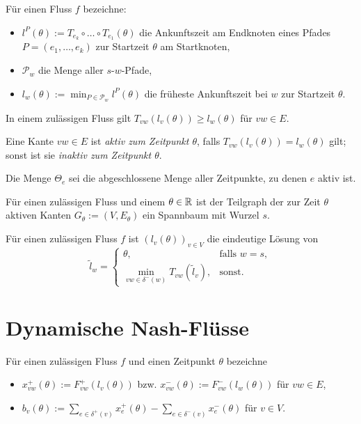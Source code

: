 	\begin{definition}
		Für einen Fluss $f$ bezeichne:
		\begin{itemize}[label=$\bullet$]
			\item $l^P(\theta) := T_{e_k}\circ\dots\circ T_{e_1}(\theta)$ die Ankunftszeit am Endknoten eines Pfades $P=(e_1,\dots,e_k)$ zur Startzeit $\theta$ am Startknoten,
			\item $\mathcal{P}_w$ die Menge aller $s$-$w$-Pfade,
			\item $l_w(\theta) := \min_{P\in\mathcal{P}_w} l^P(\theta)$ die früheste Ankunftszeit bei $w$ zur Startzeit $\theta$.
		\end{itemize}
	\end{definition}
	\begin{lemma}[Dreiecksungl.]
		In einem zulässigen Fluss gilt $T_{vw}(l_v(\theta))\geq l_w(\theta)$ für $vw\in E$.
	\end{lemma}

	\begin{definition}
		Eine Kante $vw\in E$ ist \emph{aktiv zum Zeitpunkt $\theta$}, falls $T_{vw}(l_v(\theta)) = l_w(\theta)$ gilt; sonst ist sie \emph{inaktiv zum Zeitpunkt $\theta$}.
		
		Die Menge $\Theta_e$ sei die abgeschlossene Menge aller Zeitpunkte, zu denen $e$ aktiv ist.
	\end{definition}
	\begin{lemma}
		Für einen zulässigen Fluss und einem $\theta\in\mathbb{R}$ ist der Teilgraph der zur Zeit $\theta$ aktiven Kanten $G_\theta:=(V, E_\theta)$ ein Spannbaum mit Wurzel $s$.
	\end{lemma}
	\begin{proposition}
		Für einen zulässigen Fluss $f$ ist $(l_v(\theta))_{v\in V}$ die eindeutige Lösung von
		\[ \tilde{l}_w = \begin{cases}
		\theta, & \text{falls } w=s, \\
		\min\limits_{vw\in \delta^-(w)} T_{vw}(\tilde{l}_v), & \text{sonst}.
		\end{cases} \]
	\end{proposition}

\section{Dynamische Nash-Flüsse}	
	\begin{definition}
		Für einen zulässigen Fluss $f$ und einen Zeitpunkt $\theta$ bezeichne
		\begin{itemize}[label=$\bullet$]
			\item $x_{vw}^+(\theta):= F_{vw}^+(l_v(\theta))$ bzw. $x_{vw}^-(\theta):= F^-_{vw}(l_w(\theta))$ für $vw\in E$,
			\item $b_v(\theta) := \sum_{e\in\delta^+(v)} x_e^+(\theta) - \sum_{e\in\delta^-(v)} x_e^-(\theta)$ für $v\in V$.
		\end{itemize}
	\end{definition}
	
